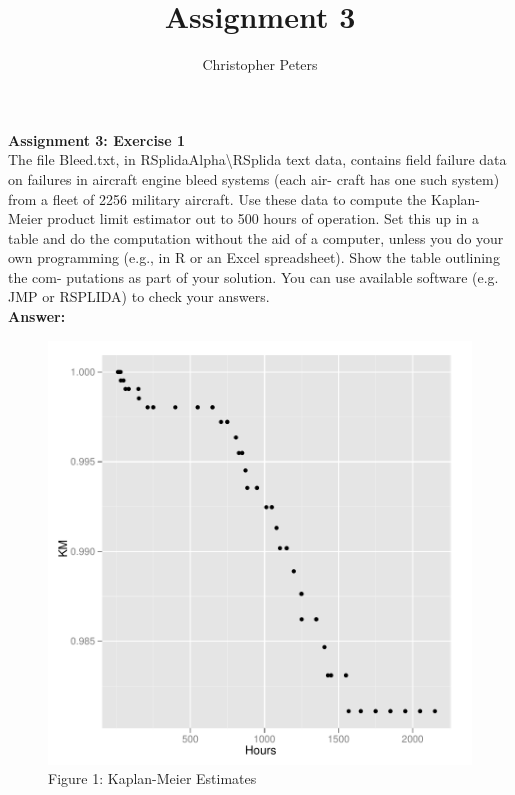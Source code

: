 \documentclass{article}
\begin{document}
\title{Assignment 3}
\author{Christopher Peters}
\maketitle

{\bf Assignment 3: Exercise 1}\\

The file Bleed.txt, in RSplidaAlpha\textbackslash RSplida text data, contains
field failure data on failures in aircraft engine bleed systems (each air-
craft has one such system) from a fleet of 2256 military aircraft. Use
these data to compute the Kaplan-Meier product limit estimator out to
500 hours of operation. Set this up in a table and do the computation
without the aid of a computer, unless you do your own programming
(e.g., in R or an Excel spreadsheet). Show the table outlining the com-
putations as part of your solution. You can use available software (e.g.
JMP or RSPLIDA) to check your answers.\\


{\bf Answer:}





\begin{figure}[htbp]
\begin{center}
\includegraphics{assignment3_sweave-004}
\caption{Figure 1: Kaplan-Meier Estimates}
\end{center}  
\end{figure}
\end{document}
